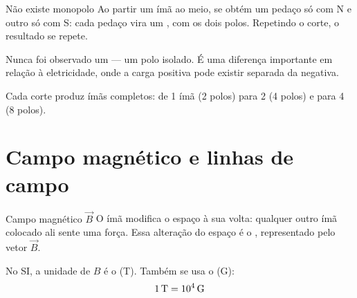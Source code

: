 \documentclass{notaaula}
\newcommand{\pedaco}[3]{%
  \pgfmathsetmacro{\pxm}{(#1+#2)/2}%
  \fill[naCoral] (#1,{#3-0.23}) rectangle (\pxm,{#3+0.23});
  \fill[naAzul]  (\pxm,{#3-0.23}) rectangle (#2,{#3+0.23});
  \node[font=\tiny\bfseries, text=naFundo] at ({(#1+\pxm)/2},#3) {N};
  \node[font=\tiny\bfseries, text=naFundo] at ({(\pxm+#2)/2},#3) {S};}
\begin{document}
\begin{copiar}{Não existe monopolo}
 Ao partir um ímã ao meio,  se obtém um pedaço só com N e
outro só com S: cada pedaço vira um , com os dois polos.
Repetindo o corte, o resultado se repete.

Nunca foi observado um  — um polo isolado. É uma
diferença importante em relação à eletricidade, onde a carga positiva pode
existir separada da negativa.
\end{copiar}

\begin{figuranota}{Cada corte produz ímãs completos: de 1 ímã (2 polos) para 2
(4 polos) e para 4 (8 polos).}
\end{figuranota}

\section{Campo magnético e linhas de campo}

\begin{copiar}{Campo magnético $\vec{B}$}
 O ímã modifica o espaço à sua volta: qualquer outro ímã colocado ali
sente uma força. Essa alteração do espaço é o ,
representado pelo vetor $\vec{B}$.

No SI, a unidade de $B$ é o  (T). Também se usa o  (G):
\[ 1\,\mathrm{T} = 10^{4}\,\mathrm{G} \]
\end{copiar}
\end{document}
